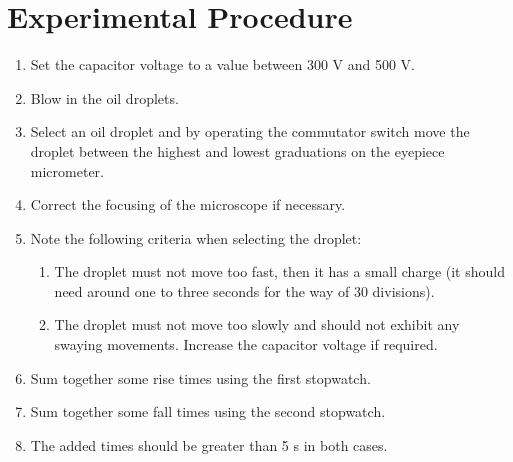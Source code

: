 \documentclass[%
 reprint,
 amsmath,amssymb,
 aps,
]{revtex4-2}
\begin{document}
\section{Experimental Procedure}
    \begin{enumerate}
        \item Set the capacitor voltage to a value between 300 V and 500 V.
        \item Blow in the oil droplets.
        \item Select an oil droplet and by operating the commutator switch move the droplet between the highest and lowest graduations on the eyepiece micrometer.
        \item Correct the focusing of the microscope if necessary.
        \item Note the following criteria when selecting the droplet:
            \begin{enumerate}
                \item The droplet must not move too fast, then it has a small charge (it should need around one to three seconds for the way of 30 divisions).
                \item The droplet must not move too slowly and should not exhibit any swaying movements. Increase the capacitor voltage if required. 
            \end{enumerate}
        \item Sum together some rise times using the first stopwatch.
        \item Sum together some fall times using the second stopwatch.
        \item The added times should be greater than 5 s in both cases.
    \end{enumerate}
    
    
\end{document}
